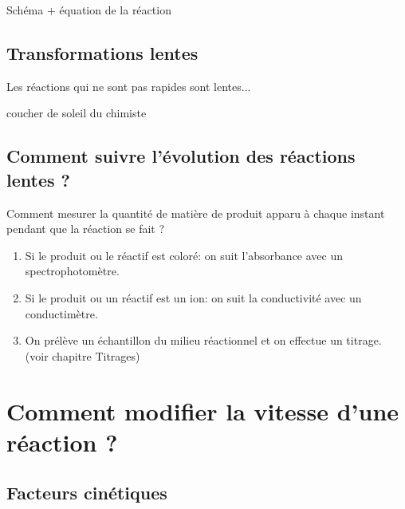 Schéma + équation de la réaction

\vspace{3cm}

\subsection{Transformations lentes}
Les réactions qui ne sont pas rapides sont lentes...


coucher de soleil du chimiste

\subsection{Comment suivre l'évolution des réactions lentes ?}

 Comment mesurer la quantité de matière de produit apparu à chaque instant pendant que la réaction se fait ?

\begin{enumerate}
	\item Si le produit ou le réactif est coloré: on suit l'absorbance avec un spectrophotomètre.
	\item Si le produit ou un réactif est un ion: on suit la conductivité avec un conductimètre.
	\item On prélève un échantillon du milieu réactionnel et on effectue un titrage. (voir chapitre Titrages)	
\end{enumerate}

\section{Comment modifier la vitesse d'une réaction ?}
\subsection{Facteurs cinétiques}

